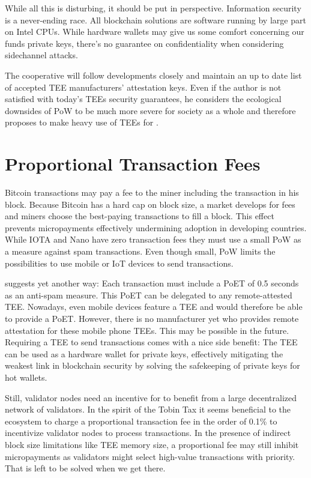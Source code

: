\documentclass[conference]{IEEEtran}
\begin{document}
While all this is disturbing, it should be put in perspective. Information security is a never-ending race. All blockchain solutions are software running by large part on Intel CPUs. While hardware wallets may give us some comfort concerning our funds private keys, there's no guarantee on confidentiality when considering sidechannel attacks. 

The \encointer cooperative will follow developments closely and maintain an up to date list of accepted TEE manufacturers' attestation keys. Even if the author is not satisfied with today's TEEs security guarantees, he considers the ecological downsides of PoW to be much more severe for society as a whole and therefore proposes to make heavy use of TEEs for \encointer.

\section{Proportional Transaction Fees}
Bitcoin transactions may pay a fee to the miner including the transaction in his block. Because Bitcoin has a hard cap on block size, a market develops for fees and miners choose the best-paying transactions to fill a block. This effect prevents micropayments effectively undermining adoption in developing countries. While IOTA \cite{iota} and Nano \cite{nano} have zero transaction fees they must use a small PoW as a measure against spam transactions. Even though small, PoW limits the possibilities to use mobile or IoT devices to send transactions.

\encointer suggests yet another way: Each transaction must include a PoET of 0.5 seconds as an anti-spam measure. This PoET can be delegated to any remote-attested TEE. Nowadays, even mobile devices feature a TEE and would therefore be able to provide a PoET. However, there is no manufacturer yet who provides remote attestation for these mobile phone TEEs. This may be possible in the future. Requiring a TEE to send transactions comes with a nice side benefit: The TEE can be used as a hardware wallet for private keys, effectively mitigating the weakest link in blockchain security by solving the safekeeping of private keys for hot wallets.
 
Still, validator nodes need an incentive for \encointer to benefit from a large decentralized network of validators. In the spirit of the Tobin Tax \cite{tobin72} it seems beneficial to the \encointer ecosystem to charge a proportional transaction fee in the order of 0.1\% to incentivize validator nodes to process transactions. In the presence of indirect block size limitations like TEE memory size, a proportional fee may still inhibit micropayments as validators might select high-value transactions with priority. That is left to be solved when we get there.
 
\end{document}
